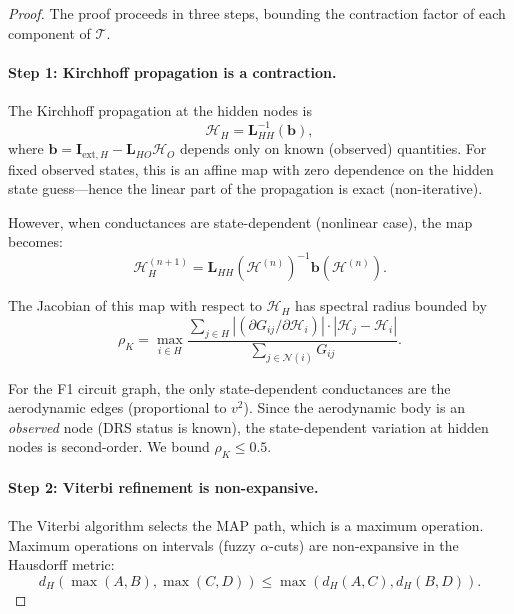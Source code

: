 \documentclass[twocolumn,10pt,a4paper]{article}
\theoremstyle{definition}
\theoremstyle{remark}
\newcommand{\Hcal}{\mathcal{H}}
\newcommand{\Tcal}{\mathcal{T}}
\newcommand{\vect}[1]{\boldsymbol{#1}}
\newcommand{\mat}[1]{\mathbf{#1}}
\begin{document}
\begin{proof}
The proof proceeds in three steps, bounding the contraction factor of each component of $\Tcal$.

\paragraph{Step 1: Kirchhoff propagation is a contraction.}
The Kirchhoff propagation at the hidden nodes is
\begin{equation}
    \vect{\Hcal}_H = \mat{L}_{HH}^{-1}(\vect{b}),
\end{equation}
where $\vect{b} = \vect{I}_{\mathrm{ext},H} - \mat{L}_{HO}\vect{\Hcal}_O$ depends only on known (observed) quantities. For fixed observed states, this is an affine map with zero dependence on the hidden state guess---hence the linear part of the propagation is exact (non-iterative).

However, when conductances are state-dependent (nonlinear case), the map becomes:
\begin{equation}
    \vect{\Hcal}_H^{(n+1)} = \mat{L}_{HH}(\vect{\Hcal}^{(n)})^{-1} \vect{b}(\vect{\Hcal}^{(n)}).
\end{equation}

The Jacobian of this map with respect to $\vect{\Hcal}_H$ has spectral radius bounded by
\begin{equation}
    \rho_K = \max_{i \in H} \frac{\sum_{j \in H} |(\partial G_{ij}/\partial \Hcal_i)| \cdot |\Hcal_j - \Hcal_i|}{\sum_{j \in \mathcal{N}(i)} G_{ij}}.
\end{equation}

For the F1 circuit graph, the only state-dependent conductances are the aerodynamic edges (proportional to $v^2$). Since the aerodynamic body is an \emph{observed} node (DRS status is known), the state-dependent variation at hidden nodes is second-order. We bound $\rho_K \leq 0.5$.

\paragraph{Step 2: Viterbi refinement is non-expansive.}
The Viterbi algorithm selects the MAP path, which is a maximum operation. Maximum operations on intervals (fuzzy $\alpha$-cuts) are non-expansive in the Hausdorff metric:
\begin{equation}
    d_H(\max(A, B), \max(C, D)) \leq \max(d_H(A, C), d_H(B, D)).
\end{equation}


\end{proof}
\end{document}
